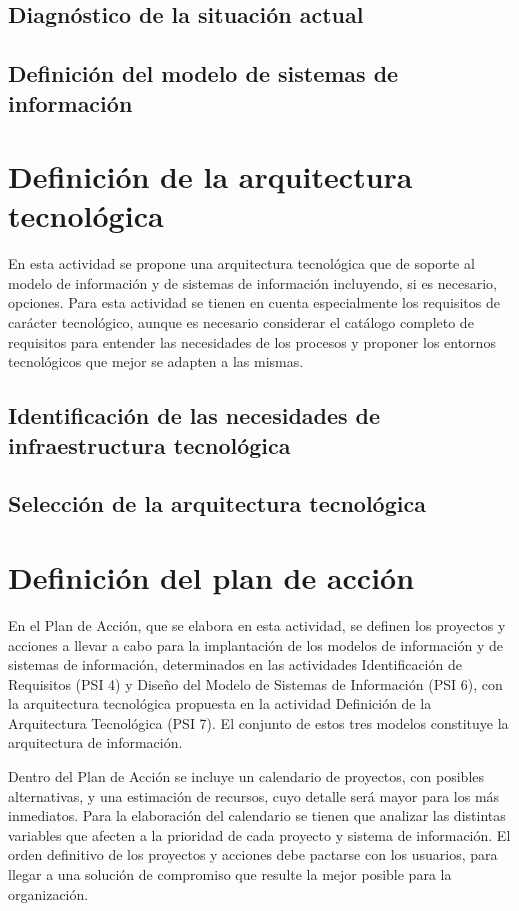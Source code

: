 \documentclass[12pt,a4paper,spanish,twoside]{book}
\begin{document}
\begin{enumerate}
\begin{itemize}
\section{Diagnóstico de la situación actual}

\section{Definición del modelo de sistemas de información}


\chapter{Definición de la arquitectura tecnológica}
En esta actividad se propone una arquitectura tecnológica que de soporte al
modelo de información y de sistemas de información incluyendo, si es
necesario, opciones. Para esta actividad se tienen en cuenta especialmente
los requisitos de carácter tecnológico, aunque es necesario considerar el
catálogo completo de requisitos para entender las necesidades de los procesos
y proponer los entornos tecnológicos que mejor se adapten a las mismas. 

\section{Identificación de las necesidades de infraestructura tecnológica}

\section{Selección de la arquitectura tecnológica}


\chapter{Definición del plan de acción}
En el Plan de Acción, que se elabora en esta actividad, se definen los
proyectos y acciones a llevar a cabo para la implantación de los modelos de
información y de sistemas de información, determinados en las actividades
Identificación de Requisitos (PSI 4) y Diseño del Modelo de Sistemas de
Información (PSI 6), con la arquitectura tecnológica propuesta en la
actividad Definición de la Arquitectura Tecnológica (PSI 7). El conjunto de
estos tres modelos constituye la arquitectura de información. 

Dentro del Plan
de Acción se incluye un calendario de proyectos, con posibles alternativas, y
una estimación de recursos, cuyo detalle será mayor para los más
inmediatos. Para la elaboración del calendario se tienen que analizar las
distintas variables que afecten a la prioridad de cada proyecto y sistema de
información. El orden definitivo de los proyectos y acciones debe pactarse
con los usuarios, para llegar a una solución de compromiso que resulte la
mejor posible para la organización. 


\end{itemize}
\end{enumerate}
\end{document}
